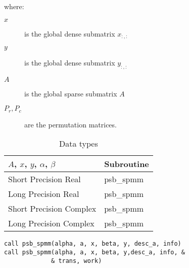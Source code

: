 where:
\begin{description}
\item[$x$] is the global dense submatrix $x_{:, :}$
\item[$y$] is the global dense submatrix $y_{:, :}$
\item[$A$] is the global sparse submatrix $A$
\item[$P_r, P_c$] are the permutation matrices.
\end{description}

\begin{table}[h]
\begin{center}
\begin{tabular}{ll}
\hline
$A$, $x$, $y$, $\alpha$, $\beta$ & {\bf Subroutine}\\
\hline
Short Precision Real & psb\_spmm \\
Long Precision Real & psb\_spmm \\
Short Precision Complex & psb\_spmm \\
Long Precision Complex & psb\_spmm \\
\hline
\end{tabular}
\end{center}
\caption{Data types\label{tab:f90spmm}}
\end{table}

\begin{verbatim}
call psb_spmm(alpha, a, x, beta, y, desc_a, info)
call psb_spmm(alpha, a, x, beta, y,desc_a, info, &
             & trans, work)
\end{verbatim} 

